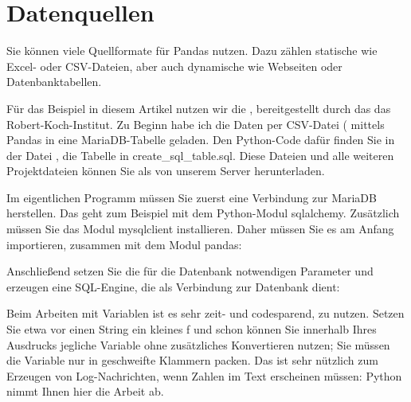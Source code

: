\section{Datenquellen}

Sie können viele Quellformate für Pandas nutzen. Dazu zählen statische wie Excel- oder CSV-Dateien, aber auch dynamische wie Webseiten oder Datenbanktabellen.

Für das Beispiel in diesem Artikel nutzen wir die , bereitgestellt durch das das Robert-Koch-Institut. Zu Beginn habe ich die Daten per CSV-Datei ( mittels Pandas in eine MariaDB-Tabelle geladen. Den Python-Code dafür finden Sie in der Datei , die Tabelle in create\_sql\_table.sql. Diese Dateien und alle weiteren Projektdateien können Sie als  von unserem Server herunterladen.

Im eigentlichen Programm müssen Sie zuerst eine Verbindung zur MariaDB herstellen. Das geht zum Beispiel mit dem Python-Modul sqlalchemy. Zusätzlich müssen Sie das Modul mysqlclient installieren. Daher müssen Sie es am Anfang importieren, zusammen mit dem Modul pandas:

\medskip



\medskip

Anschließend setzen Sie die für die Datenbank notwendigen Parameter und erzeugen eine SQL-Engine, die als Verbindung zur Datenbank dient:

\medskip


\medskip

Beim Arbeiten mit Variablen ist es sehr zeit- und codesparend,  zu nutzen. Setzen Sie etwa vor einen String ein kleines f und schon können Sie innerhalb Ihres Ausdrucks jegliche Variable ohne zusätzliches Konvertieren nutzen; Sie müssen die Variable nur in geschweifte Klammern packen. Das ist sehr nützlich zum Erzeugen von Log-Nachrichten, wenn Zahlen im Text erscheinen müssen: Python nimmt Ihnen hier die Arbeit ab.


